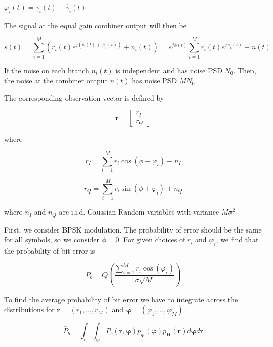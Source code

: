 \documentclass[fleqn]{article}
\begin{document}
\begin{enumerate}
		$\varphi_i(t) = \gamma_i(t) - \hat{\gamma}_i(t)$
		
		The signal at the equal gain combiner output will then be
		
		\begin{equation*}
			s(t) = \sum_{i=1}^{M}{\left(r_i(t)e^{j(\phi(t) + \varphi_i(t))}+n_i(t)\right)} = e^{j\phi(t)}\sum_{i=1}^{M}{r_i(t)e^{j\varphi_i(t)}} + n(t)
		\end{equation*}
		
		If the noise on each branch $n_i(t)$ is independent and has noise PSD $N_0$. Then, the noise at the combiner output $n(t)$ has noise PSD $MN_0$.
		
		The corresponding observation vector is defined by
		
		\begin{equation*}
			\mathbf{r} = \begin{bmatrix}
				r_I \\
				r_Q
			\end{bmatrix}
		\end{equation*}
		
		where
		
		\begin{equation*}
			r_I = \sum_{i=1}^{M}{r_i\cos(\phi + \varphi_i)} + n_I
		\end{equation*}
		
		\begin{equation*}
			r_Q = \sum_{i=1}^{M}{r_i\sin(\phi + \varphi_i)} + n_Q
		\end{equation*}
		
		where $n_I$ and $n_Q$ are i.i.d. Gaussian Random variables with variance $M\sigma^2$
		
		First, we consider BPSK modulation. The probability of error should be the same for all symbols, so we consider $\phi = 0$. For given choices of $r_i$ and $\varphi_i$, we find that the probability of bit error is
		
		\begin{equation*}
			P_b = Q\left(\frac{\sum_{i=1}^{M}{r_i\cos(\varphi_i)}}{\sigma\sqrt{M}}\right)
		\end{equation*}
		 
		To find the average probability of bit error we have to integrate across the distributions for $\mathbf{r} = (r_1,...,r_M)$ and $\boldsymbol{\varphi} = (\varphi_1,...,\varphi_M)$.
		
		\begin{equation*}
			\bar{P}_b = \int_{\mathbf{r}}{\int_{\boldsymbol{\varphi}}{P_b(\mathbf{r},\boldsymbol{\varphi})p_{\boldsymbol{\varphi}}(\boldsymbol{\varphi})p_{\mathbf{R}}(\mathbf{r})d\boldsymbol{\varphi}}d\mathbf{r}}
		\end{equation*}
		

\end{enumerate}
\end{document}
